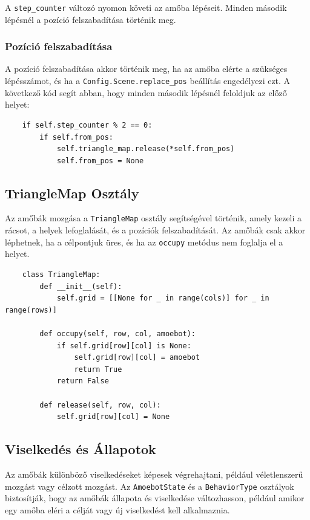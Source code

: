 \documentclass[	
  noindent
]{elteikthesis}[2024/04/26]
\begin{document}
    A \texttt{step\_counter} változó nyomon követi az amőba lépéseit. Minden második lépésnél a pozíció felszabadítása történik meg.
    
    \subsubsection{Pozíció felszabadítása}
    A pozíció felszabadítása akkor történik meg, ha az amőba elérte a szükséges lépésszámot, és ha a \texttt{Config.Scene.replace\_pos} beállítás engedélyezi ezt. A következő kód segít abban, hogy minden második lépésnél feloldjuk az előző helyet:
    
    \begin{verbatim}
    if self.step_counter % 2 == 0:
        if self.from_pos:
            self.triangle_map.release(*self.from_pos)
            self.from_pos = None
    \end{verbatim}
    
    \subsection{TriangleMap Osztály}
    Az amőbák mozgása a \texttt{TriangleMap} osztály segítségével történik, amely kezeli a rácsot, a helyek lefoglalását, és a pozíciók felszabadítását. Az amőbák csak akkor léphetnek, ha a célpontjuk üres, és ha az \texttt{occupy} metódus nem foglalja el a helyet.
    
    \begin{verbatim}
    class TriangleMap:
        def __init__(self):
            self.grid = [[None for _ in range(cols)] for _ in range(rows)]
    
        def occupy(self, row, col, amoebot):
            if self.grid[row][col] is None:
                self.grid[row][col] = amoebot
                return True
            return False
    
        def release(self, row, col):
            self.grid[row][col] = None
    \end{verbatim}
    
    \subsection{Viselkedés és Állapotok}
    Az amőbák különböző viselkedéseket képesek végrehajtani, például véletlenszerű mozgást vagy célzott mozgást. Az \texttt{AmoebotState} és a \texttt{BehaviorType} osztályok biztosítják, hogy az amőbák állapota és viselkedése változhasson, például amikor egy amőba eléri a célját vagy új viselkedést kell alkalmaznia.
    
\end{document}
